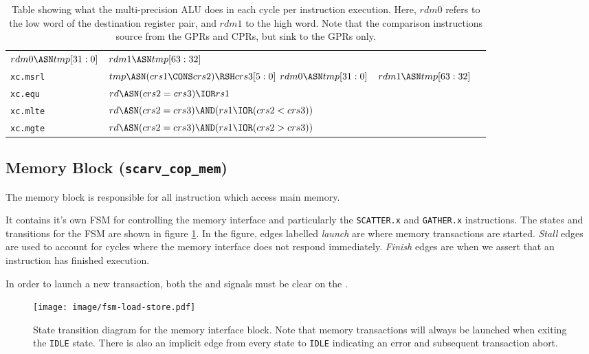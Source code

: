 \documentclass{scarv-report}
\begin{document}
\begin{table}[H]
\begin{tabularx}{\textwidth}{l Y Y Y }
    $rdm0\ASN tmp[31:0]$ 
 &  $rdm1\ASN tmp[63:32]$ 
 &
\\
{\tt xc.msrl }&
    $tmp \ASN (crs1 \CONS crs2) \RSH crs3[5:0]$\newline 
    $rdm0\ASN tmp[31:0]$ 
 &  $rdm1\ASN tmp[63:32]$ 
 &
\\
{\tt xc.equ }&
    $ rd \ASN (crs2 = crs3) \IOR rs1 $
 &
 &
\\
{\tt xc.mlte }&
    $rd \ASN (crs2 = crs3) \AND (rs1 \IOR (crs2 < crs3)) $
 &
 &
\\
{\tt xc.mgte }&
    $rd \ASN (crs2 = crs3) \AND (rs1 \IOR (crs2 > crs3)) $
 &
 &
\\
\bottomrule
\end{tabularx}
\caption{Table showing what the multi-precision ALU does in each cycle
per instruction execution. Here, $rdm0$ refers to the low word of the
destination register pair, and $rdm1$ to the high word. Note that the
comparison instructions source from the GPRs and CPRs, but sink to the
GPRs only.}
\label{tab:mp-alu-exec}
\end{table}

\subsection{Memory Block ({\tt scarv\_cop\_mem})}

The memory block is responsible for all instruction which access main
memory.

It contains it's own FSM for controlling the memory interface
and particularly the {\tt SCATTER.x} and {\tt GATHER.x} instructions.
The states and transitions for the FSM are shown in figure 
\ref{fig:mem-block-fsm}. 
In the figure, edges labelled {\em launch} are
where memory transactions are started.
{\em Stall} edges are used to
account for cycles where the memory interface does not respond immediately.
{\em Finish} edges are when we assert that an instruction has finished
execution.

In order to launch a new transaction, both the 
and  signals must be clear on the
.

\begin{figure}
\centering
\texttt{[image: image/fsm-load-store.pdf]}
\caption{State transition diagram for the memory interface block.
Note that memory transactions will always be launched when exiting the
{\tt IDLE} state. There is also an implicit edge from every state to
{\tt IDLE} indicating an error and subsequent transaction abort.}
\label{fig:mem-block-fsm}
\end{figure}
\end{document}
